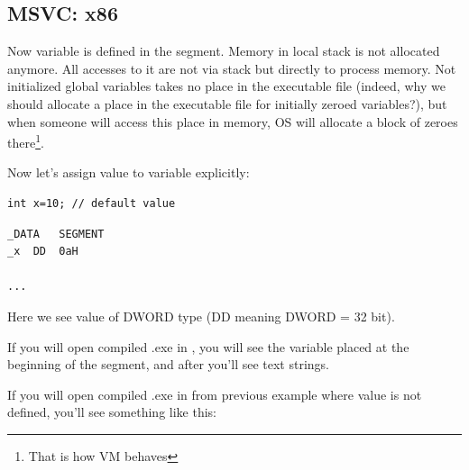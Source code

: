 \subsection{MSVC: x86}



{Now  variable is defined in the  segment. 
Memory in local stack is not allocated anymore. 
All accesses to it are not via stack but directly to process memory. 
Not initialized global variables takes no place in the executable file
(indeed, why we should allocate a place
in the executable file for initially zeroed variables?), but when someone will access this place
in memory, \ac{OS} will allocate a block of zeroes there\footnote{That is how \ac{VM} behaves}.}

{Now let's assign value to variable explicitly:}

\begin{lstlisting}
int x=10; // default value
\end{lstlisting}


\begin{lstlisting}
_DATA	SEGMENT
_x	DD	0aH

...
\end{lstlisting}

{Here we see value  of DWORD type (DD meaning DWORD = 32 bit).}

{If you will open compiled .exe in \IDA, you will see the  variable placed at the beginning of 
the  segment, and after you'll see text strings.}

{If you will open compiled .exe in \IDA from previous example where  value is not defined, 
you'll see something like this:}

